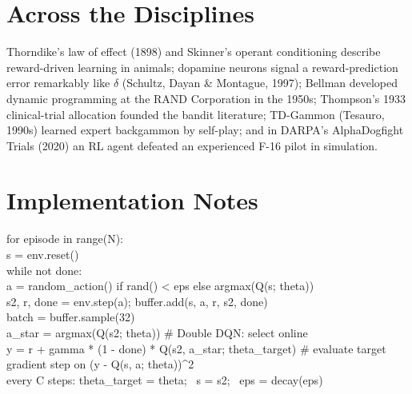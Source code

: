 \documentclass[11pt]{article}
\begin{document}
\section{Across the Disciplines}
Thorndike's law of effect (1898) and Skinner's operant conditioning describe reward-driven learning in animals; dopamine neurons signal a reward-prediction error remarkably like $\delta$ (Schultz, Dayan \& Montague, 1997); Bellman developed dynamic programming at the RAND Corporation in the 1950s; Thompson's 1933 clinical-trial allocation founded the bandit literature; TD-Gammon (Tesauro, 1990s) learned expert backgammon by self-play; and in DARPA's AlphaDogfight Trials (2020) an RL agent defeated an experienced F-16 pilot in simulation.

\section{Implementation Notes}
\begin{center}\begin{minipage}{0.92\textwidth}\small\ttfamily
for episode in range(N):\\
\hspace*{1em}s = env.reset()\\
\hspace*{1em}while not done:\\
\hspace*{2em}a = random\_action() if rand() < eps else argmax(Q(s; theta))\\
\hspace*{2em}s2, r, done = env.step(a); buffer.add(s, a, r, s2, done)\\
\hspace*{2em}batch = buffer.sample(32)\\
\hspace*{2em}a\_star = argmax(Q(s2; theta)) \quad \# Double DQN: select online\\
\hspace*{2em}y = r + gamma * (1 - done) * Q(s2, a\_star; theta\_target) \quad \# evaluate target\\
\hspace*{2em}gradient step on (y - Q(s, a; theta))\textasciicircum2\\
\hspace*{2em}every C steps: theta\_target = theta; \ s = s2; \ eps = decay(eps)
\end{minipage}\end{center}
\end{document}
